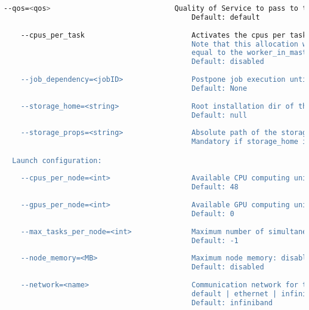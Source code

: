 \begin{lstlisting}[language=bash]
    --qos=<qos>                             Quality of Service to pass to the queue system.
                                            Default: default
                                            
    --cpus_per_task                         Activates the cpus per task allocation in the worker's execution.
                                            Note that this allocation will be equal to the cpus_per_node in a worker node and
                                            equal to the worker_in_master_cpus in a master node respectively.
                                            Default: disabled
                                            
    --job_dependency=<jobID>                Postpone job execution until the job dependency has ended.
                                            Default: None
                                            
    --storage_home=<string>                 Root installation dir of the storage implementation
                                            Default: null
                                            
    --storage_props=<string>                Absolute path of the storage properties file
                                            Mandatory if storage_home is defined

  Launch configuration:
  
    --cpus_per_node=<int>                   Available CPU computing units on each node
                                            Default: 48
                                            
    --gpus_per_node=<int>                   Available GPU computing units on each node
                                            Default: 0
                                            
    --max_tasks_per_node=<int>              Maximum number of simultaneous tasks running on a node
                                            Default: -1
                                            
    --node_memory=<MB>                      Maximum node memory: disabled | <int> (MB)
                                            Default: disabled
                                            
    --network=<name>                        Communication network for transfers: 
                                            default | ethernet | infiniband | data.
                                            Default: infiniband
                                              

\end{lstlisting}
